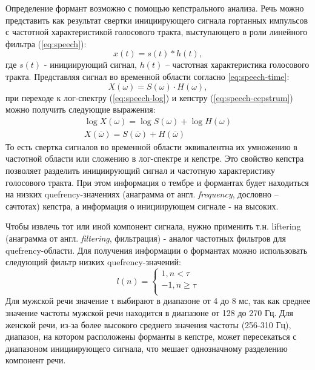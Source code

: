 Определение формант возможно с помощью кепстрального анализа. Речь можно представить как результат свертки инициирующего сигнала гортанных импульсов с частотной характеристикой голосового тракта, выступающего в роли линейного фильтра (\ref{eq:speech}):
\begin{equation}\label{eq:speech}
	x(t) = s(t) * h(t),
\end{equation}
где $s(t)$ - инициирующий сигнал, $h(t)$ -- частотная характеристика голосового тракта. Представляя сигнал во временной области согласно \ref{eq:speech-time}:
\begin{equation}\label{eq:speech-time}
	X(\omega) = S(\omega) \cdot H(\omega),
\end{equation}
при переходе к лог-спектру (\ref{eq:speech-log}) и кепстру (\ref{eq:speech-cepstrum}) можно получить следующие выражения:
\begin{gather}
	\log X(\omega) = \log S(\omega) + \log H(\omega) \label{eq:speech-log}\\
	X(\bar{\omega}) = S(\bar{\omega}) + H(\bar{\omega}) \label{eq:speech-cepstrum}
\end{gather}
То есть свертка сигналов во временной области эквивалентна их умножению в частотной области или сложению в лог-спектре и кепстре. Это свойство кепстра позволяет разделить инициирующий сигнал и частотную характеристику голосового тракта. При этом информация о тембре и формантах будет находиться на низких quefrency-значениях (анаграмма от англ. \textit{frequency}, дословно -- сачтотах) кепстра, а информация о инициирующем сигнале - на высоких.

Чтобы извлечь тот или иной компонент сигнала, нужно применить т.н. liftering (анаграмма от англ. \textit{filtering}, фильтрация) - аналог частотных фильтров для quefrency-области. Для получения информации о формантах можно использовать следующий фильтр низких quefrency-значений:
\begin{equation}
	l(n)
	= 
	\begin{cases}
		1,  n < \tau\\
		-1,  n \ge \tau\\
	\end{cases}
\end{equation}
Для мужской речи значение τ выбирают в диапазоне от 4 до 8 мс, так как среднее значение частоты мужской речи находится в диапазоне от 128 до 270 Гц. Для женской речи, из-за более высокого среднего значения частоты (256-310 Гц), диапазон, на котором расположены форманты в кепстре, может пересекаться с диапазоном инициирующего сигнала, что мешает однозначному разделению компонент речи.


